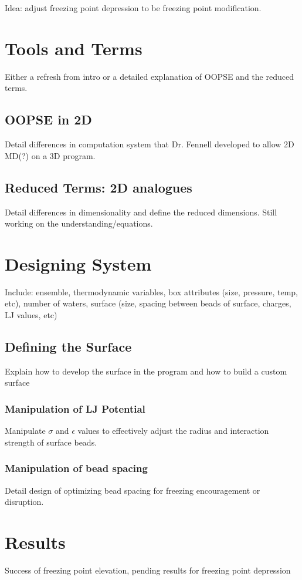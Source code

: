 Idea: adjust freezing point depression to be freezing point modification.

\section{Tools and Terms}

Either a refresh from intro or a detailed explanation of OOPSE and the reduced terms.

\subsection{OOPSE in 2D}

Detail differences in computation system that Dr. Fennell developed to allow 2D MD(?) on a 3D program.

\subsection{Reduced Terms: 2D analogues}

Detail differences in dimensionality and define the reduced dimensions. Still working on the understanding/equations.

\section{Designing System}

Include: 
ensemble, 
thermodynamic variables, 
box attributes (size, pressure, temp, etc), 
number of waters,
surface (size, spacing between beads of surface, charges, LJ values, etc)

\subsection{Defining the Surface}

Explain how to develop the surface in the program and how to build a custom surface 

\subsubsection{Manipulation of LJ Potential}

Manipulate $\sigma$ and $\epsilon$ values to effectively adjust the radius and interaction strength of surface beads.

\subsubsection{Manipulation of bead spacing}

Detail design of optimizing bead spacing for freezing encouragement or disruption.

\section{Results}

Success of freezing point elevation, pending results for freezing point depression



